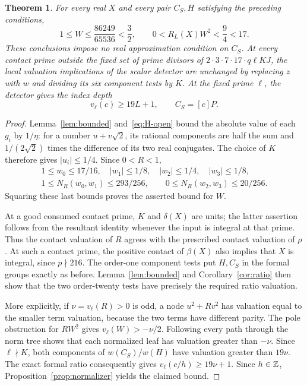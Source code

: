 \documentclass[11pt]{article}
\newtheorem{theorem}{Theorem}[section]
\theoremstyle{remark}\newtheorem{remark}[theorem]{Remark}
\begin{document}
\begin{theorem}\label{thm:uniform}
For every real $X$ and every pair $C_S,H$ satisfying the preceding
conditions,
\[
 1\le W\le\frac{86249}{65536}<\frac32,
 \qquad 0<R_L(X)W^2<\frac94<17.
\]
These conclusions impose no real approximation condition on $C_S$.
At every contact prime outside the fixed set of prime divisors of
$2\cdot3\cdot7\cdot17\cdot q\ell KJ$, the local valuation implications
of the scalar detector are unchanged by replacing $z$ with $w$
and dividing its six component tests by $K$.
At the fixed prime $\ell$, the detector gives the index depth
\[
                  v_\ell(c)\ge19L+1,
       \qquad C_S=[c]P.
\]
\end{theorem}
\begin{proof}
Lemma~\ref{lem:bounded} and~\eqref{eq:H-open} bound the absolute
value of each $g_i$ by $1/\eta$: for a number $u+v\sqrt2$,
its rational components are half the sum and $1/(2\sqrt2)$
times the difference of its two real conjugates.
The choice of $K$ therefore gives $|u_i|\le1/4$.
Since $0<R<1$,
\[
 \begin{split}
 1\le w_0\le17/16,\quad |w_1|\le1/8,\quad
 |w_2|\le1/4,\quad |w_3|\le1/8,\\
 1\le N_R(w_0,w_1)\le293/256,\qquad
 0\le N_R(w_2,w_3)\le20/256.
 \end{split}
\]
Squaring these last bounds proves the asserted bound for $W$.

At a good consumed contact prime, $K$ and $\delta(X)$ are units;
the latter assertion follows from the resultant identity whenever
the input is integral at that prime.  Thus the contact valuation
of $R$ agrees with the prescribed contact valuation of $\rho$.  At such a contact prime, the positive contact of $\beta(X)$
also implies that $X$ is integral, since $p\nmid216$.
The order-one component tests put
$H,C_S$ in the formal groups exactly as before.  Lemma~\ref{lem:bounded}
and Corollary~\ref{cor:ratio} then show that the two order-twenty
tests have precisely the required ratio valuation.

More explicitly, if $\nu=v_\ell(R)>0$ is odd, a node
$u^2+Rv^2$ has valuation equal to the smaller term valuation,
because the two terms have different parity.  The pole obstruction
for $RW^2$ gives $v_\ell(W)>-\nu/2$.  Following every path through
the norm tree shows that each normalized leaf has valuation
greater than $-\nu$.  Since $\ell\nmid K$, both components of
$w(C_S)/w(H)$ have valuation greater than $19\nu$.  The exact
formal ratio consequently gives $v_\ell(c/h)\ge19\nu+1$.
Since $h\in\mathbb Z$, Proposition~\ref{prop:normalizer} yields the
claimed bound.
\end{proof}
\end{document}
